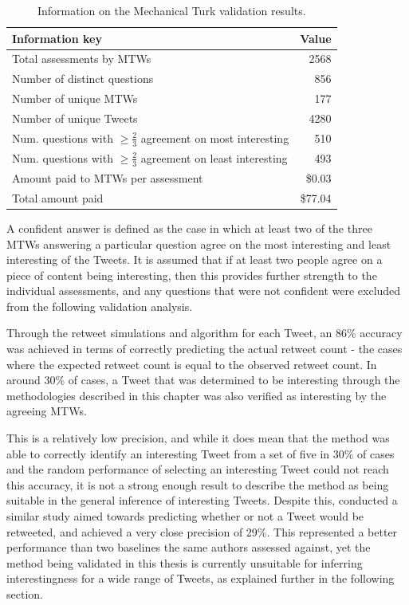 \begin{table}[h]\footnotesize
\begin{center}
\begin{tabular}{ l || r }
     Information key & Value\\
     \hline
     \hline
	 Total assessments by MTWs & 2568\\
	 Number of distinct questions & 856\\
	 Number of unique MTWs & 177\\
	 Number of unique Tweets & 4280\\
	 \hline
	 Num. questions with $\geq \frac{2}{3}$ agreement on most interesting & 510\\
	 Num. questions with $\geq \frac{2}{3}$ agreement on least interesting & 493\\
	 \hline
	 Amount paid to MTWs per assessment & \$0.03\\
	 Total amount paid & \$77.04\\
     \hline
\end{tabular}
\end{center}
\caption{Information on the Mechanical Turk validation results.}
\label{table:mtk_data_1}
\end{table}

A confident answer is defined as the case in which at least two of the three MTWs answering a particular question agree on the most interesting and least interesting of the Tweets. It is assumed that if at least two people agree on a piece of content being interesting, then this provides further strength to the individual assessments, and any questions that were not confident were excluded from the following validation analysis.

Through the retweet simulations and algorithm for each Tweet, an 86\% accuracy was achieved in terms of correctly predicting the actual retweet count - the cases where the expected retweet count is equal to the observed retweet count. In around 30\% of cases, a Tweet that was determined to be interesting through the methodologies described in this chapter was also verified as interesting by the agreeing MTWs.

This is a relatively low precision, and while it does mean that the method was able to correctly identify an interesting Tweet from a set of five in 30\% of cases and the random performance of selecting an interesting Tweet could not reach this accuracy, it is not a strong enough result to describe the method as being suitable in the general inference of interesting Tweets. Despite this, \citet{yang10} conducted a similar study aimed towards predicting whether or not a Tweet would be retweeted, and achieved a very close precision of 29\%. This represented a better performance than two baselines the same authors assessed against, yet the method being validated in this thesis is currently unsuitable for inferring interestingness for a wide range of Tweets, as explained further in the following section. 

